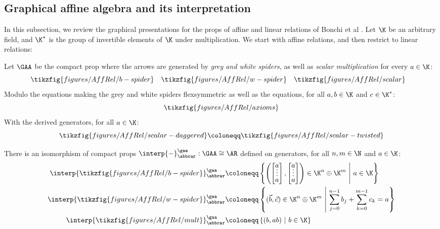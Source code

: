 \subsection{Graphical affine algebra and its interpretation}
In this subsection, we review the graphical presentations for the props of affine and linear relations of Bonchi et al \cite{gaa,gla}.
Let \(\K\) be an arbitrary field, and  \(\K^*\) is the group of invertible elements of \(\K\) under multiplication.
We start with affine relations, and then restrict  to linear relations:
\begin{definition}
\label{def:gaa}
  Let \(\GAA\) be the compact prop where the arrows are generated by  {\em grey and white spiders}, as well as {\em scalar multiplication} for every \(a \in \K\):
  \[
    \tikzfig{figures/AffRel/b-spider}\quad
    \tikzfig{figures/AffRel/w-spider}\quad
    \tikzfig{figures/AffRel/scalar}\quad
  \]
  Modulo the equations making the grey and white spiders flexsymmetric as well as the equations, for all \(a,b\in \K\) and \(c \in \K^*\):
  \[\tikzfig{figures/AffRel/axioms}\]
  With the derived generators, for all \(a\in\K\):
  \[
    \tikzfig{figures/AffRel/scalar-daggered}
    \coloneqq 
    \tikzfig{figures/AffRel/scalar-twisted}
  \]
\end{definition}
\begin{theorem}
  There is an isomorphism of compact props  \(\interp{-}^{\gaa}_{\abbrar}:\GAA \cong \AR\)  defined on generators, for all \(n,m\in\N\) and \(a\in \K\):
  \begin{align*}
    \interp{\tikzfig{figures/AffRel/b-spider}}^{\gaa}_{\abbrar}
      &\coloneqq
         \left\{
           \left(
             \begingroup
               \renewcommand*{\arraystretch}{.7}
               \begin{bmatrix}
                 a\vspace*{-.2cm}\\ \vdots \\ a
               \end{bmatrix}
               ,
               \begin{bmatrix}
                 a\vspace*{-.2cm}\\ \vdots \\ a
               \end{bmatrix}
             \endgroup
           \right) \in \K^{n}\oplus \K^m
           \ \middle|\
           a \in \K 
         \right\} \\
    \interp{ \tikzfig{figures/AffRel/w-spider}}^{\gaa}_{\abbrar}
      &\coloneqq 
        \left\{ 
          (\vec b, \vec c)
          \in \K^n \oplus \K^m
          \ \middle|\
          \sum_{j=0}^{n-1} b_j + \sum_{k=0}^{m-1} c_k  = a 
        \right\} \\
    \interp{ \tikzfig{figures/AffRel/mult}}^{\gaa}_{\abbrar}
    &\coloneqq \left\{ \left(b,ab \right) \ \middle|\ b \in \K \right\}
  \end{align*}
\end{theorem}
